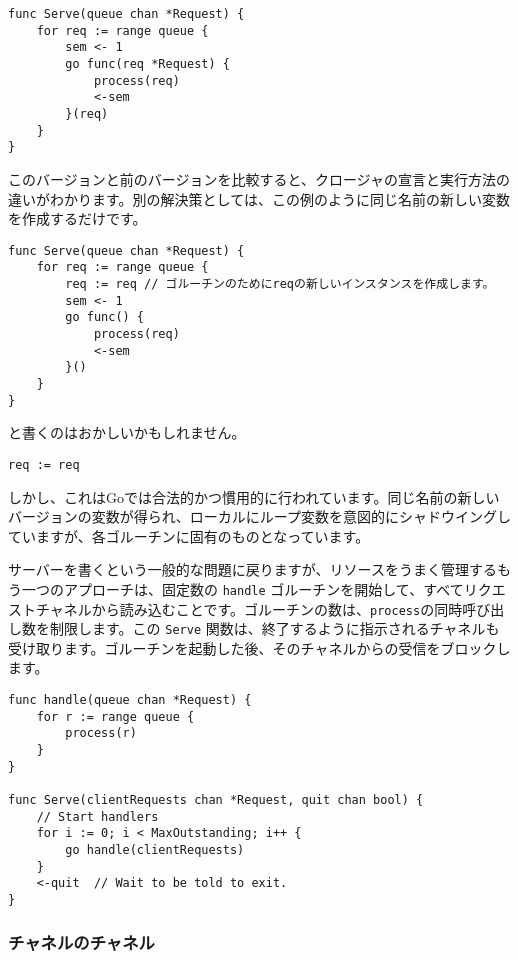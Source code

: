 \documentclass{jsarticle}
\begin{document}
\begin{lstlisting}[numbers=none]
func Serve(queue chan *Request) {
    for req := range queue {
        sem <- 1
        go func(req *Request) {
            process(req)
            <-sem
        }(req)
    }
}
\end{lstlisting}

このバージョンと前のバージョンを比較すると、クロージャの宣言と実行方法の違いがわかります。別の解決策としては、この例のように同じ名前の新しい変数を作成するだけです。

\begin{lstlisting}[numbers=none]
func Serve(queue chan *Request) {
    for req := range queue {
        req := req // ゴルーチンのためにreqの新しいインスタンスを作成します。
        sem <- 1
        go func() {
            process(req)
            <-sem
        }()
    }
}
\end{lstlisting}

と書くのはおかしいかもしれません。

\begin{lstlisting}[numbers=none]
req := req
\end{lstlisting}

しかし、これはGoでは合法的かつ慣用的に行われています。同じ名前の新しいバージョンの変数が得られ、ローカルにループ変数を意図的にシャドウイングしていますが、各ゴルーチンに固有のものとなっています。

サーバーを書くという一般的な問題に戻りますが、リソースをうまく管理するもう一つのアプローチは、固定数の
\texttt{handle}
ゴルーチンを開始して、すべてリクエストチャネルから読み込むことです。ゴルーチンの数は、\texttt{process}の同時呼び出し数を制限します。この
\texttt{Serve}
関数は、終了するように指示されるチャネルも受け取ります。ゴルーチンを起動した後、そのチャネルからの受信をブロックします。

\begin{lstlisting}[numbers=none]
func handle(queue chan *Request) {
    for r := range queue {
        process(r)
    }
}

func Serve(clientRequests chan *Request, quit chan bool) {
    // Start handlers
    for i := 0; i < MaxOutstanding; i++ {
        go handle(clientRequests)
    }
    <-quit  // Wait to be told to exit.
}
\end{lstlisting}

\subsubsection{チャネルのチャネル}
\end{document}
